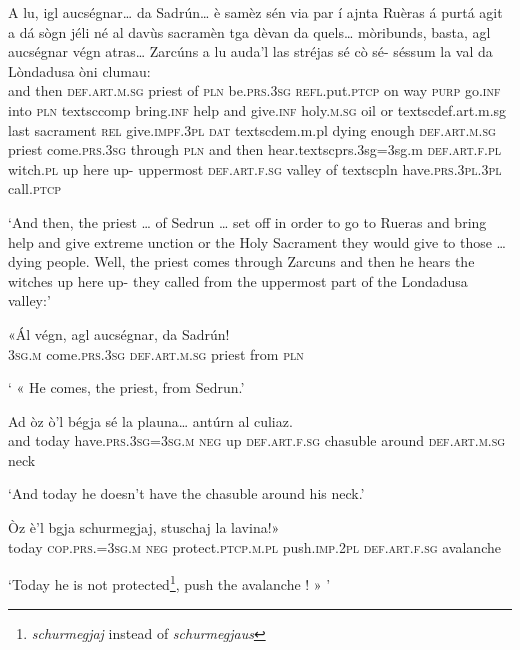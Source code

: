 \begin{linenumbers}
\gll    A lu, igl aucségnar… da Sadrún… è samèz sén via par í ajnta Ruèras á purtá agit a dá sògn jéli né al davùs sacramèn tga dèvan da quels… mòribunds, basta, agl aucségnar végn atras… Zarcúns a lu auda’l las stréjas sé cò sé- séssum la val da Lòndadusa òni clumau:\\
and then \textsc{def.art.m.sg} priest of \textsc{pln} be.\textsc{prs.3sg} \textsc{refl.}put.\textsc{ptcp} on way \textsc{purp} go.\textsc{inf} into \textsc{pln}  textsc{comp} bring.\textsc{inf} help and give.\textsc{inf} holy.\textsc{m.sg} oil or textsc{def.art.m.sg} last sacrament \textsc{rel} give.\textsc{impf.3pl} \textsc{dat} textsc{dem.m.pl} dying enough \textsc{def.art.m.sg} priest come.\textsc{prs.3sg} through \textsc{pln} and then hear.textsc{prs.3sg=3sg.m} \textsc{def.art.f.pl} witch.\textsc{pl} up here up- uppermost \textsc{def.art.f.sg} valley of  textsc{pln} have.\textsc{prs.3pl.3pl} call.\textsc{ptcp}\\
\end{linenumbers}
\medskip
\glt `And then, the priest … of Sedrun … set off in order to go to Rueras and bring help and give extreme unction or the Holy Sacrament they would give to those … dying people. Well, the priest comes through Zarcuns and then he hears the witches up here up- they called from the uppermost part of the Londadusa valley:'
\medskip

\begin{linenumbers}
\gll  «Ál végn, agl aucségnar, da Sadrún! \\
 \textsc{3sg.m} come.\textsc{prs.3sg} \textsc{def.art.m.sg} priest from \textsc{pln}  \\
\end{linenumbers}
\medskip
\glt ` « He comes, the priest, from Sedrun.'
\medskip

\begin{linenumbers}
\gll    Ad òz ò’l bégja sé la plauna… antúrn al culiaz.\\
and today have.\textsc{prs.3sg=3sg.m} \textsc{neg} up \textsc{def.art.f.sg} chasuble around \textsc{def.art.m.sg} neck  \\
\end{linenumbers}
\medskip
\glt `And today he doesn’t have the chasuble around his neck.'
\medskip

\begin{linenumbers}
\gll  Òz è’l bgja schurmegjaj, stuschaj la lavina!» \\
today \textsc{cop.prs.=3sg.m} \textsc{neg} protect.\textsc{ptcp.m.pl} push.\textsc{imp.2pl} \textsc{def.art.f.sg} avalanche \\
\end{linenumbers}
\medskip
\glt `Today he is not protected\footnote{\textit{schurmegjaj} instead of \textit{schurmegjaus}}, push the avalanche ! » '
\medskip\textit{}

